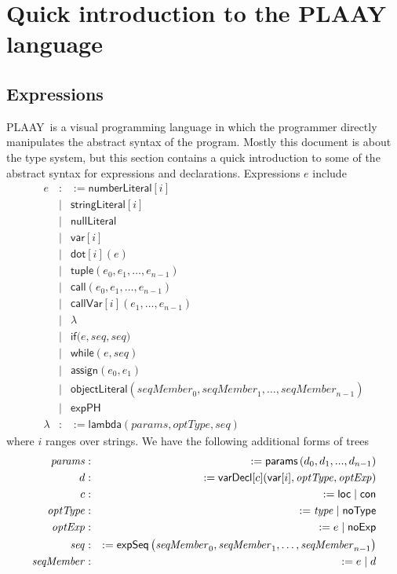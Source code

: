 \documentclass[12pt]{article}
\begin{document}
\section{Quick introduction to the PLAAY language}

\subsection{Expressions}

PLAAY\ is a visual programming language in which the programmer directly
manipulates the abstract syntax of the program. Mostly this document is
about the type system, but this section contains a quick introduction to
some of the abstract syntax for expressions and declarations. Expressions $e$
include%
\begin{eqnarray*}
e &:&:=\mathsf{numberLiteral}\left[ i\right]  \\
&\mid &\mathsf{stringLiteral}[i] \\
&\mid &\mathsf{nullLiteral} \\
&\mid &\mathsf{var}[i] \\
&\mid &\mathsf{dot}\left[ i\right] (e) \\
&\mid &\mathsf{tuple}\left( e_{0},e_{1},\ldots ,e_{n-1}\right)  \\
&\mid &\mathsf{call}(e_{0},e_{1},\ldots ,e_{n-1}) \\
&\mid &\mathsf{callVar}[i](e_{1},\ldots ,e_{n-1}) \\
&\mid &\lambda  \\
&\mid &\mathsf{if}(e,\mathit{seq},\mathit{seq)} \\
&\mid &\mathsf{while}\left( e,\mathit{seq}\right)  \\
&\mid &\mathsf{assign}(e_{0},e_{1}) \\
&\mid &\mathsf{objectLiteral}\left( \mathit{seqMember}_{0},\mathit{seqMember}%
_{1},\ldots ,\mathit{seqMember}_{n-1}\right)  \\
&\mid &\mathsf{expPH} \\
\lambda  &:&:=\mathsf{lambda}(\mathit{params},\mathit{optType,seq})
\end{eqnarray*}%
where $i$ ranges over strings. We have the following additional forms of
trees%
\begin{eqnarray*}
\mathit{params} &:&:=\mathsf{params}\left( d_{0},d_{1},...,d_{n-1}\right)  \\
d &:&:=\mathsf{varDecl}[c]\mathsf{(var}[i],\mathit{optType,optExp}) \\
c &:&:=\mathsf{loc}\mid \mathsf{con} \\
\mathit{optType} &:&:=\mathit{type}\mid \mathsf{noType} \\
\mathit{optExp} &:&:=e\mid \mathsf{noExp} \\
\mathit{seq} &:&:=\mathsf{expSeq}\left( \mathit{seqMember}_{0},\mathit{%
seqMember}_{1},\ldots ,\mathit{seqMember}_{n-1}\right)  \\
\mathit{seqMember} &:&:=e\mid d
\end{eqnarray*}
\end{document}
